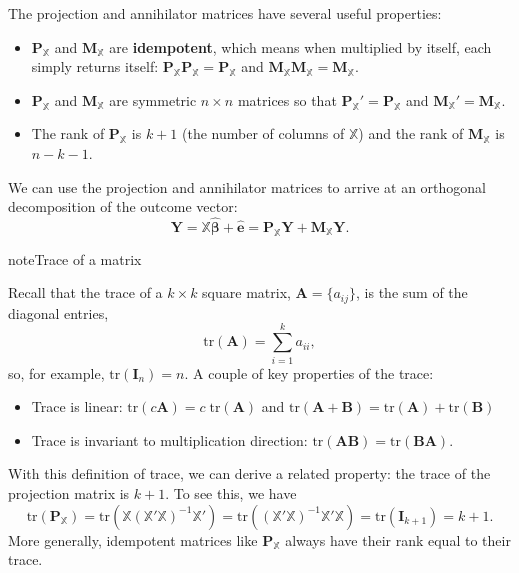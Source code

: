 \documentclass[
  13pt,
  letterpaper,
  DIV=11,
  numbers=noendperiod]{scrreprt}
\providecommand{\tightlist}{%
  \setlength{\itemsep}{0pt}\setlength{\parskip}{0pt}}
\newcommand{\mb}{\bm}
\newcommand{\Xmat}{\mathbb{X}}
\newcommand{\bhat}{\widehat{\mb{\beta}}}
\theoremstyle{plain}
\theoremstyle{plain}
\theoremstyle{definition}
\theoremstyle{definition}
\theoremstyle{remark}
\begin{document}
The projection and annihilator matrices have several useful properties:

\begin{itemize}
\tightlist
\item
  \(\mb{P}_{\Xmat}\) and \(\mb{M}_{\Xmat}\) are \textbf{idempotent},
  which means when multiplied by itself, each simply returns itself:
  \(\mb{P}_{\Xmat}\mb{P}_{\Xmat} = \mb{P}_{\Xmat}\) and
  \(\mb{M}_{\Xmat}\mb{M}_{\Xmat} = \mb{M}_{\Xmat}\).
\item
  \(\mb{P}_{\Xmat}\) and \(\mb{M}_{\Xmat}\) are symmetric \(n \times n\)
  matrices so that \(\mb{P}_{\Xmat}' = \mb{P}_{\Xmat}\) and
  \(\mb{M}_{\Xmat}' = \mb{M}_{\Xmat}\).
\item
  The rank of \(\mb{P}_{\Xmat}\) is \(k+1\) (the number of columns of
  \(\Xmat\)) and the rank of \(\mb{M}_{\Xmat}\) is \(n - k - 1\).
\end{itemize}

We can use the projection and annihilator matrices to arrive at an
orthogonal decomposition of the outcome vector: \[ 
\mb{Y} = \Xmat\bhat + \widehat{\mb{e}} = \mb{P}_{\Xmat}\mb{Y} + \mb{M}_{\Xmat}\mb{Y}.
\]

\begin{bookcallout}{note}{Trace of a matrix}

Recall that the trace of a \(k \times k\) square matrix,
\(\mb{A} = \{a_{ij}\}\), is the sum of the diagonal entries, \[
\text{tr}(\mb{A}) = \sum_{i=1}^{k} a_{ii},
\] so, for example, \(\text{tr}(\mb{I}_{n}) = n\). A couple of key
properties of the trace:

\begin{itemize}
\tightlist
\item
  Trace is linear: \(\text{tr}(c\mb{A}) = c\; \text{tr}(\mb{A})\) and
  \(\text{tr}(\mb{A} + \mb{B}) = \text{tr}(\mb{A}) + \text{tr}(\mb{B})\)
\item
  Trace is invariant to multiplication direction:
  \(\text{tr}(\mb{AB}) = \text{tr}(\mb{BA})\).
\end{itemize}

\end{bookcallout}

With this definition of trace, we can derive a related property: the
trace of the projection matrix is \(k+1\). To see this, we have
\[\text{tr}(\mb{P}_{\Xmat}) = \text{tr}(\Xmat (\Xmat'\Xmat)^{-1} \Xmat') = \text{tr}((\Xmat'\Xmat)^{-1} \Xmat'\Xmat) = \text{tr}(\mb{I}_{k+1}) = k+1.\]
More generally, idempotent matrices like \(\mb{P}_{\Xmat}\) always have
their rank equal to their trace.
\end{document}
